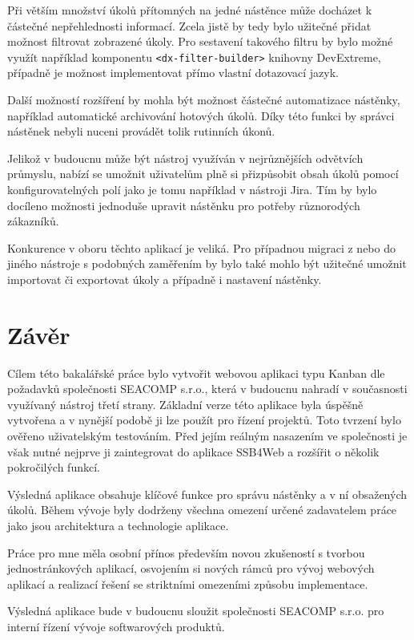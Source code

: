 Při větším množství úkolů přítomných na jedné nástěnce může docházet k částečné nepřehlednosti informací. Zcela jistě by tedy bylo užitečné přidat možnost filtrovat zobrazené úkoly. Pro sestavení takového filtru by bylo možné využít například komponentu \texttt{<dx-filter-builder>} knihovny DevExtreme, případně je možnost implementovat přímo vlastní dotazovací jazyk.

Další možností rozšíření by mohla být možnost částečné automatizace nástěnky, například automatické archivování hotových úkolů. Díky této funkci by správci nástěnek nebyli nuceni provádět tolik rutinních úkonů. 

Jelikož v budoucnu může být nástroj využíván v nejrůznějších odvětvích průmyslu, nabízí se umožnit uživatelům plně si přizpůsobit obsah úkolů pomocí konfigurovatelných polí jako je tomu například v nástroji Jira. Tím by bylo docíleno možnosti jednoduše upravit nástěnku pro potřeby různorodých zákazníků.

Konkurence v oboru těchto aplikací je veliká. Pro případnou migraci z nebo do jiného nástroje s podobných zaměřením by bylo také mohlo být užitečné umožnit importovat či exportovat úkoly a případně i nastavení nástěnky.




\chapter{Závěr}
Cílem této bakalářské práce bylo vytvořit webovou aplikaci typu Kanban dle požadavků společnosti SEACOMP s.r.o., která v budoucnu nahradí v současnosti využívaný nástroj třetí strany. Základní verze této aplikace byla úspěšně vytvořena a v nynější podobě ji lze použít pro řízení projektů. Toto tvrzení bylo ověřeno uživatelským testováním. Před jejím reálným nasazením ve společnosti je však nutné nejprve ji zaintegrovat do aplikace SSB4Web a rozšířit o několik pokročilých funkcí.

Výsledná aplikace obsahuje klíčové funkce pro správu nástěnky a v ní obsažených úkolů. Během vývoje byly dodrženy všechna omezení určené zadavatelem práce jako jsou architektura a technologie aplikace.

Práce pro mne měla osobní přínos především novou zkušeností s tvorbou jednostránkových aplikací, osvojením si nových rámců pro vývoj webových aplikací a realizací řešení se striktními omezeními způsobu implementace.

Výsledná aplikace bude v budoucnu sloužit společnosti SEACOMP s.r.o. pro interní řízení vývoje softwarových produktů.
